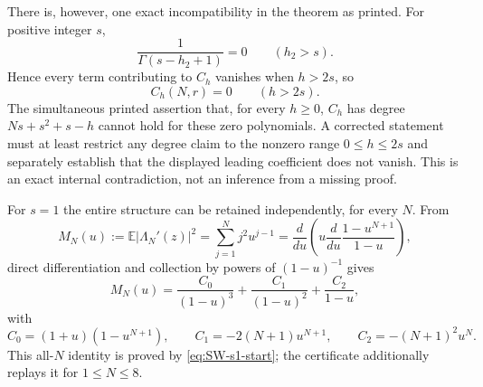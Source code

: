 There is, however, one exact incompatibility in the theorem as printed.  For positive integer
$s$,
\begin{equation}
 \frac1{\Gamma(s-h_2+1)}=0\qquad(h_2>s).
\end{equation}
Hence every term contributing to $C_h$ vanishes when $h>2s$, so
\begin{equation}
 C_h(N,r)=0\qquad(h>2s).
 \label{eq:SW-Ch-truncation}
\end{equation}
The simultaneous printed assertion that, for every $h\geq0$, $C_h$ has degree
$Ns+s^2+s-h$ cannot hold for these zero polynomials.  A corrected statement must at least
restrict any degree claim to the nonzero range $0\leq h\leq2s$ and separately establish that
the displayed leading coefficient does not vanish.  This is an exact internal contradiction,
not an inference from a missing proof.

For $s=1$ the entire structure can be retained independently, for every $N$.  From
\begin{equation}
 M_N(u):=\mathbb E|\Lambda_N'(z)|^2=\sum_{j=1}^{N}j^2u^{j-1}
 =\frac{d}{du}\left(u\frac{d}{du}\frac{1-u^{N+1}}{1-u}\right),
 \label{eq:SW-s1-start}
\end{equation}
direct differentiation and collection by powers of $(1-u)^{-1}$ gives
\begin{equation}
 M_N(u)=\frac{C_0}{(1-u)^3}+\frac{C_1}{(1-u)^2}+\frac{C_2}{1-u},
 \label{eq:SW-s1-structure}
\end{equation}
with
\begin{equation}
 C_0=(1+u)(1-u^{N+1}),\qquad
 C_1=-2(N+1)u^{N+1},\qquad
 C_2=-(N+1)^2u^N.
 \label{eq:SW-s1-coefficients}
\end{equation}
This all-$N$ identity is proved by \eqref{eq:SW-s1-start}; the certificate additionally
replays it for $1\leq N\leq8$.

